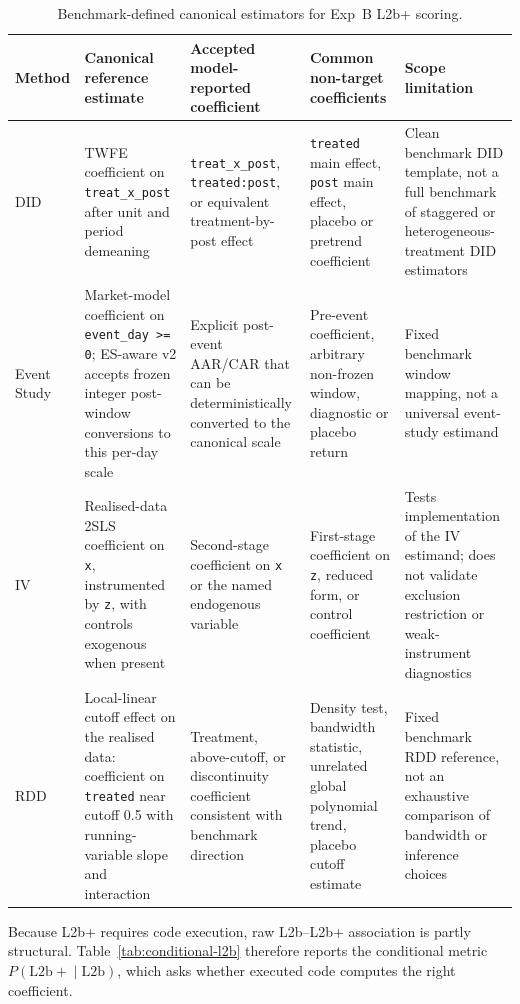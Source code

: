 \documentclass{article}
\begin{document}
\begin{table}[h]
\centering
\caption{Benchmark-defined canonical estimators for Exp~B L2b+ scoring.}
\label{tab:canonical-targets}
\scriptsize
\renewcommand{\arraystretch}{1.10}
\setlength{\tabcolsep}{3pt}
\begin{tabularx}{\textwidth}{lXXXX}
\toprule
\textbf{Method} & \textbf{Canonical reference estimate} &
\textbf{Accepted model-reported coefficient} &
\textbf{Common non-target coefficients} & \textbf{Scope limitation} \\
\midrule
DID & TWFE coefficient on \texttt{treat\_x\_post} after unit and period
demeaning & \texttt{treat\_x\_post}, \texttt{treated:post}, or equivalent
treatment-by-post effect & \texttt{treated} main effect, \texttt{post} main
effect, placebo or pretrend coefficient & Clean benchmark DID template, not a
full benchmark of staggered or heterogeneous-treatment DID estimators \\
Event Study & Market-model coefficient on \texttt{event\_day >= 0}; ES-aware
v2 accepts frozen integer post-window conversions to this per-day scale &
Explicit post-event AAR/CAR that can be deterministically converted to the
canonical scale & Pre-event coefficient, arbitrary non-frozen window,
diagnostic or placebo return & Fixed benchmark window mapping, not a universal
event-study estimand \\
IV & Realised-data 2SLS coefficient on \texttt{x}, instrumented by
\texttt{z}, with controls exogenous when present & Second-stage coefficient on
\texttt{x} or the named endogenous variable & First-stage coefficient on
\texttt{z}, reduced form, or control coefficient & Tests implementation of the
IV estimand; does not validate exclusion restriction or weak-instrument
diagnostics \\
RDD & Local-linear cutoff effect on the realised data: coefficient on
\texttt{treated} near cutoff 0.5 with running-variable slope and interaction &
Treatment, above-cutoff, or discontinuity coefficient consistent with benchmark
direction & Density test, bandwidth statistic, unrelated global polynomial
trend, placebo cutoff estimate & Fixed benchmark RDD reference, not an
exhaustive comparison of bandwidth or inference choices \\
\bottomrule
\end{tabularx}
\end{table}

Because L2b+ requires code execution, raw L2b--L2b+ association is partly
structural. Table~\ref{tab:conditional-l2b} therefore reports the conditional
metric $P(\mathrm{L2b+}\mid \mathrm{L2b})$, which asks whether executed code
computes the right coefficient.
\end{document}
